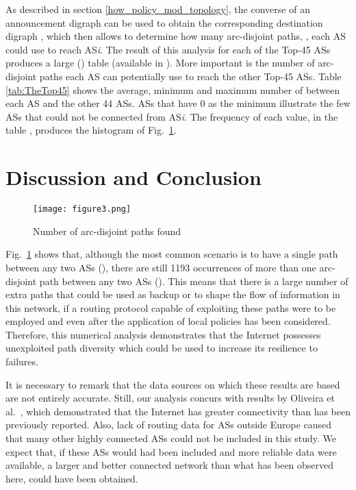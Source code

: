 \documentclass[10pt,final,journal]{IEEEtran}
\begin{document}
As described in section \ref{how_policy_mod_topology}, the converse of an announcement digraph  can be used to obtain the corresponding destination digraph , which then allows to determine how many arc-disjoint paths, , each AS could use to reach AS\textit{i}. The result of this analysis for each of the Top-45 ASs produces a  large () table (available in \cite{Arjona-Villicana2009}). More important is the number of arc-disjoint paths each AS can potentially use to reach the other Top-45 ASs. Table \ref{tab:TheTop45} shows the average, minimum and maximum number of  between each AS and the other 44 ASs. ASs that have 0 as the minimum illustrate the few ASs that could not be connected from AS\textit{i}. The frequency of each  value, in the  table \cite{Arjona-Villicana2009}, produces the histogram of Fig.~\ref{fig:num_arc_disj_paths}.

\section{Discussion and Conclusion}\label{discussion_and_conlcusion}

\begin{figure}[!t]
	\centering
		\texttt{[image: figure3.png]}
	\caption{Number of arc-disjoint paths found}
	\label{fig:num_arc_disj_paths}
\end{figure}

Fig.~\ref{fig:num_arc_disj_paths} shows that, although the most common scenario is to have a single path between any two ASs (), there are still 1193 occurrences of more than one arc-disjoint path between any two ASs (). This means that there is a large number of extra paths that could be used as backup or to shape the flow of information in this network, if a routing protocol capable of exploiting these paths were to be employed and even after the application of local policies has been considered. Therefore, this numerical analysis demonstrates that the Internet possesses unexploited path diversity which could be used to increase its resilience to failures.

It is necessary to remark that the data sources on which these results are based are not entirely accurate. Still, our analysis concurs with results by Oliveira et al.~\cite{Oliveira2008}, which demonstrated that the Internet has greater connectivity than has been previously reported. Also, lack of routing data for ASs outside Europe caused that many other highly connected ASs could not be included in this study. We expect that, if these ASs would had been included and more reliable data were available, a larger and better connected network than what has been observed here, could have been obtained.
\end{document}
